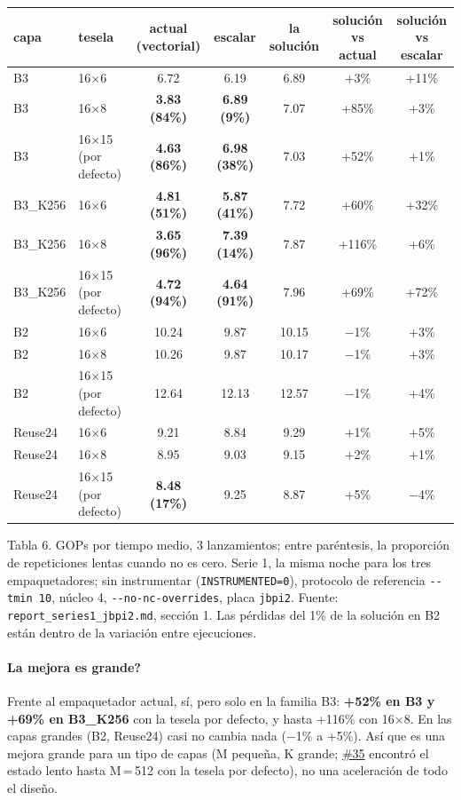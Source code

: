 \documentclass[10pt,a4paper]{article}
\newcommand{\iss}[1]{\href{https://github.com/JieGH/RVV_code_gen_via_MLIR_xDSL/issues/#1}{\##1}}
\newcommand{\bad}[1]{\textcolor{red!70!black}{\textbf{#1}}}
\newcommand{\key}[1]{\textbf{\textcolor{blue!55!black}{#1}}}  %
\begin{document}
\begin{center}\footnotesize\setlength{\tabcolsep}{4pt}
\begin{tabular}{@{}llccccc@{}}
\toprule
capa & tesela & actual (vectorial) & escalar & la solución & solución vs actual & solución vs escalar \\
\midrule
B3 & 16$\times$6 & 6.72 & 6.19 & 6.89 & +3\% & +11\% \\
B3 & 16$\times$8 & \bad{3.83 (84\%)} & \bad{6.89 (9\%)} & 7.07 & +85\% & +3\% \\
B3 & 16$\times$15 (por defecto) & \bad{4.63 (86\%)} & \bad{6.98 (38\%)} & 7.03 & +52\% & +1\% \\
B3\_K256 & 16$\times$6 & \bad{4.81 (51\%)} & \bad{5.87 (41\%)} & 7.72 & +60\% & +32\% \\
B3\_K256 & 16$\times$8 & \bad{3.65 (96\%)} & \bad{7.39 (14\%)} & 7.87 & +116\% & +6\% \\
B3\_K256 & 16$\times$15 (por defecto) & \bad{4.72 (94\%)} & \bad{4.64 (91\%)} & 7.96 & +69\% & +72\% \\
\midrule
B2 & 16$\times$6 & 10.24 & 9.87 & 10.15 & $-$1\% & +3\% \\
B2 & 16$\times$8 & 10.26 & 9.87 & 10.17 & $-$1\% & +3\% \\
B2 & 16$\times$15 (por defecto) & 12.64 & 12.13 & 12.57 & $-$1\% & +4\% \\
Reuse24 & 16$\times$6 & 9.21 & 8.84 & 9.29 & +1\% & +5\% \\
Reuse24 & 16$\times$8 & 8.95 & 9.03 & 9.15 & +2\% & +1\% \\
Reuse24 & 16$\times$15 (por defecto) & \bad{8.48 (17\%)} & 9.25 & 8.87 & +5\% & $-$4\% \\
\bottomrule
\end{tabular}
\end{center}
{\footnotesize Tabla 6. GOPs por tiempo medio, 3 lanzamientos; entre paréntesis, la proporción de repeticiones lentas cuando no es
cero. Serie 1, la misma noche para los tres empaquetadores; sin instrumentar (\texttt{INSTRUMENTED=0}), protocolo de referencia
\texttt{-{}-tmin 10}, núcleo 4, \texttt{-{}-no-nc-overrides}, placa \texttt{jbpi2}. Fuente: \texttt{report\_series1\_jbpi2.md},
sección 1. Las pérdidas del 1\% de la solución en B2 están dentro de la variación entre ejecuciones.}

\paragraph{\textquestiondown{}La mejora es grande?} Frente al empaquetador actual, sí, pero solo en la familia B3: \key{+52\% en B3 y +69\% en B3\_K256} con
la tesela por defecto, y hasta +116\% con 16$\times$8. En las capas grandes (B2, Reuse24) casi no cambia nada ($-$1\% a +5\%). Así
que es una mejora grande para un tipo de capas (M pequeña, K grande; \iss{35} encontró el estado lento hasta M\,=\,512 con la tesela
por defecto), no una aceleración de todo el diseño.
\end{document}
